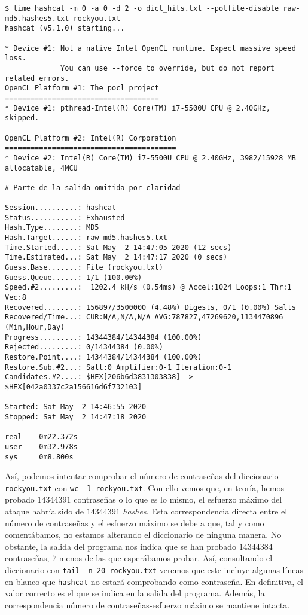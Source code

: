 \documentclass{article}
\begin{document}
            \begin{verbatim}
$ time hashcat -m 0 -a 0 -d 2 -o dict_hits.txt --potfile-disable raw-md5.hashes5.txt rockyou.txt
hashcat (v5.1.0) starting...

* Device #1: Not a native Intel OpenCL runtime. Expect massive speed loss.
             You can use --force to override, but do not report related errors.
OpenCL Platform #1: The pocl project
====================================
* Device #1: pthread-Intel(R) Core(TM) i7-5500U CPU @ 2.40GHz, skipped.

OpenCL Platform #2: Intel(R) Corporation
========================================
* Device #2: Intel(R) Core(TM) i7-5500U CPU @ 2.40GHz, 3982/15928 MB allocatable, 4MCU

# Parte de la salida omitida por claridad

Session..........: hashcat
Status...........: Exhausted
Hash.Type........: MD5
Hash.Target......: raw-md5.hashes5.txt
Time.Started.....: Sat May  2 14:47:05 2020 (12 secs)
Time.Estimated...: Sat May  2 14:47:17 2020 (0 secs)
Guess.Base.......: File (rockyou.txt)
Guess.Queue......: 1/1 (100.00%)
Speed.#2.........:  1202.4 kH/s (0.54ms) @ Accel:1024 Loops:1 Thr:1 Vec:8
Recovered........: 156897/3500000 (4.48%) Digests, 0/1 (0.00%) Salts
Recovered/Time...: CUR:N/A,N/A,N/A AVG:787827,47269620,1134470896 (Min,Hour,Day)
Progress.........: 14344384/14344384 (100.00%)
Rejected.........: 0/14344384 (0.00%)
Restore.Point....: 14344384/14344384 (100.00%)
Restore.Sub.#2...: Salt:0 Amplifier:0-1 Iteration:0-1
Candidates.#2....: $HEX[206b6d3831303838] -> $HEX[042a0337c2a156616d6f732103]

Started: Sat May  2 14:46:55 2020
Stopped: Sat May  2 14:47:18 2020

real    0m22.372s
user    0m32.978s
sys     0m8.800s
            \end{verbatim}

            Así, podemos intentar comprobar el número de contraseñas del diccionario \texttt{rockyou.txt} con \texttt{wc -l rockyou.txt}. Con ello vemos que, en teoría, hemos probado $14344391$ contraseñas o lo que es lo mismo, el esfuerzo máximo del ataque habría sido de $14344391$ \textit{hashes}. Esta correspondencia directa entre el número de contraseñas y el esfuerzo máximo se debe a que, tal y como comentábamos, no estamos alterando el diccionario de ninguna manera. No obstante, la salida del programa nos indica que se han probado $14344384$ contraseñas, $7$ menos de las que esperábamos probar. Así, consultando el diccionario con \texttt{tail -n 20 rockyou.txt} veremos que este incluye algunas líneas en blanco que \texttt{hashcat} no estará comprobando como contraseña. En definitiva, el valor correcto es el que se indica en la salida del programa. Además, la correspondencia número de contraseñas-esfuerzo máximo se mantiene intacta.
\end{document}
